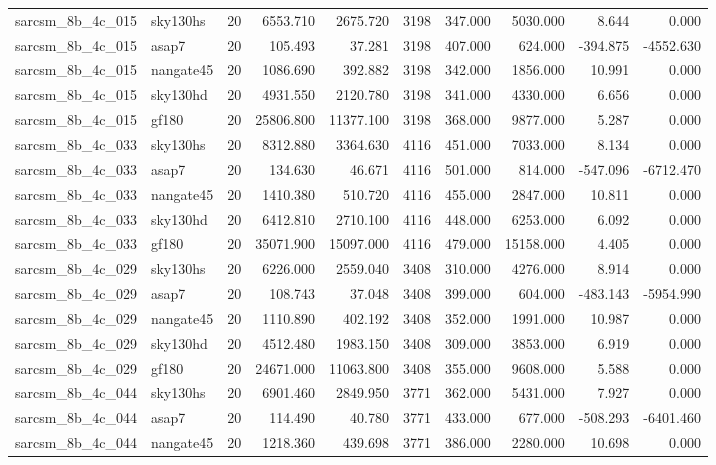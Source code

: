 \begin{tabular}{llrrrrrrrr}
sarcsm\_8b\_4c\_015 & sky130hs & 20 & 6553.710 & 2675.720 & 3198 & 347.000 & 5030.000 & 8.644 & 0.000 \\
sarcsm\_8b\_4c\_015 & asap7 & 20 & 105.493 & 37.281 & 3198 & 407.000 & 624.000 & -394.875 & -4552.630 \\
sarcsm\_8b\_4c\_015 & nangate45 & 20 & 1086.690 & 392.882 & 3198 & 342.000 & 1856.000 & 10.991 & 0.000 \\
sarcsm\_8b\_4c\_015 & sky130hd & 20 & 4931.550 & 2120.780 & 3198 & 341.000 & 4330.000 & 6.656 & 0.000 \\
sarcsm\_8b\_4c\_015 & gf180 & 20 & 25806.800 & 11377.100 & 3198 & 368.000 & 9877.000 & 5.287 & 0.000 \\
sarcsm\_8b\_4c\_033 & sky130hs & 20 & 8312.880 & 3364.630 & 4116 & 451.000 & 7033.000 & 8.134 & 0.000 \\
sarcsm\_8b\_4c\_033 & asap7 & 20 & 134.630 & 46.671 & 4116 & 501.000 & 814.000 & -547.096 & -6712.470 \\
sarcsm\_8b\_4c\_033 & nangate45 & 20 & 1410.380 & 510.720 & 4116 & 455.000 & 2847.000 & 10.811 & 0.000 \\
sarcsm\_8b\_4c\_033 & sky130hd & 20 & 6412.810 & 2710.100 & 4116 & 448.000 & 6253.000 & 6.092 & 0.000 \\
sarcsm\_8b\_4c\_033 & gf180 & 20 & 35071.900 & 15097.000 & 4116 & 479.000 & 15158.000 & 4.405 & 0.000 \\
sarcsm\_8b\_4c\_029 & sky130hs & 20 & 6226.000 & 2559.040 & 3408 & 310.000 & 4276.000 & 8.914 & 0.000 \\
sarcsm\_8b\_4c\_029 & asap7 & 20 & 108.743 & 37.048 & 3408 & 399.000 & 604.000 & -483.143 & -5954.990 \\
sarcsm\_8b\_4c\_029 & nangate45 & 20 & 1110.890 & 402.192 & 3408 & 352.000 & 1991.000 & 10.987 & 0.000 \\
sarcsm\_8b\_4c\_029 & sky130hd & 20 & 4512.480 & 1983.150 & 3408 & 309.000 & 3853.000 & 6.919 & 0.000 \\
sarcsm\_8b\_4c\_029 & gf180 & 20 & 24671.000 & 11063.800 & 3408 & 355.000 & 9608.000 & 5.588 & 0.000 \\
sarcsm\_8b\_4c\_044 & sky130hs & 20 & 6901.460 & 2849.950 & 3771 & 362.000 & 5431.000 & 7.927 & 0.000 \\
sarcsm\_8b\_4c\_044 & asap7 & 20 & 114.490 & 40.780 & 3771 & 433.000 & 677.000 & -508.293 & -6401.460 \\
sarcsm\_8b\_4c\_044 & nangate45 & 20 & 1218.360 & 439.698 & 3771 & 386.000 & 2280.000 & 10.698 & 0.000 \\

\end{tabular}
